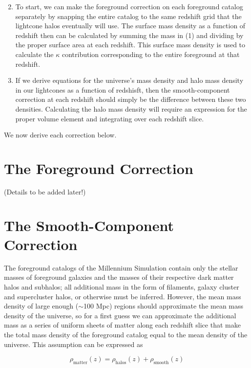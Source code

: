 \documentclass[12pt]{article}
\begin{document}
\begin{enumerate}[label=(\arabic*)]
\setcounter{enumi}{1}
\item To start, we can make the foreground correction on each foreground catalog separately by snapping the entire catalog to the same redshift grid that the lightcone halos eventually will use. The surface mass density as a function of redshift then can be calculated by summing the mass in (1) and dividing by the proper surface area at each redshift. This surface mass density is used to calculate the $\kappa$ contribution corresponding to the entire foreground at that redshift.
\item If we derive equations for the universe's mass density and halo mass density in our lightcones as a function of redshisft, then the smooth-component correction at each redshift should simply be the difference between these two densities. Calculating the halo mass density will require an expression for the proper volume element and integrating over each redshift slice.
\end{enumerate}

We now derive each correction below.

\section*{The Foreground Correction}

(Details to be added later!)

\section*{The Smooth-Component Correction}

The foreground catalogs of the Millennium Simulation contain only the stellar masses of foreground galaxies and the masses of their respective dark matter halos and subhalos; all additional mass in the form of filaments, galaxy cluster and supercluster halos, or otherwise must be inferred. However, the mean mass density of large enough ($\sim$100 Mpc) regions should approximate the mean mass density of the universe, so for a first guess we can approximate the additional mass as a series of uniform sheets of matter along each redshift slice that make the total mass density of the foreground catalog equal to the mean density of the universe. This assumption can be expressed as

\begin{equation}\label{smooth_correction1}
\rho_{\text{matter}}(z)=\rho_{\text{halos}}(z)+\rho_{\text{smooth}}(z)
\end{equation}
\end{document}
